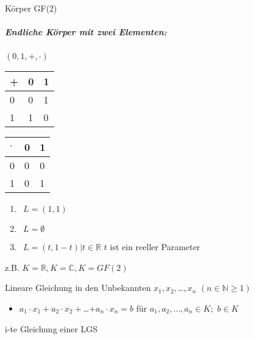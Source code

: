 \documentclass{../tudscript}
\begin{document}
\hypertarget{einfuxfchrung-in-die-mathematik-fuxfcr-informatikerinnen}{%
\label{einfuxfchrung-in-die-mathematik-fuxfcr-informatikerinnen}}

\hypertarget{vl}{%
\label{vl}}

\hypertarget{kuxf6rper-galois-field-gf}{%
\label{kuxf6rper-galois-field-gf}}

Körper GF(2)

\hypertarget{endliche-kuxf6rper-mit-zwei-elementen}{%
\subparagraph{Endliche Körper mit zwei
Elementen:}\label{endliche-kuxf6rper-mit-zwei-elementen}}

\(({0,1},+,\cdot)\)

\begin{longtable}[]{@{}lll@{}}
\toprule
+ & 0 & 1\tabularnewline
\midrule
\endhead
0 & 0 & 1\tabularnewline
1 & 1 & 0\tabularnewline
\bottomrule
\end{longtable}

\begin{longtable}[]{@{}lll@{}}
\toprule
\(\cdot\) & 0 & 1\tabularnewline
\midrule
\endhead
0 & 0 & 0\tabularnewline
1 & 0 & 1\tabularnewline
\bottomrule
\end{longtable}

\begin{enumerate}
\def\labelenumi{\arabic{enumi}.}
\tightlist
\item
  \(\ \ L = {(1,1)}\)
\item
  \(\ \ L = \emptyset\)
\item
  \(\ \ L = {(t,1-t)|t\in\mathbb{R}}\) \(t\) ist ein reeller Parameter
\end{enumerate}

\hypertarget{lgs-und-matritzen-uxfcber-einem-kuxf6rper-k}{%
\label{lgs-und-matritzen-uxfcber-einem-kuxf6rper-k}}

z.B. \(K=\mathbb{R}, K=\mathbb{C},K=GF(2)\)

Lineare Gleichung in den Unbekannten \(x_1,x_2,\)\ldots{}\(,x_n\)
\((n \in \mathbb{N} \geq 1)\)

\begin{itemize}
\tightlist
\item
  \(a_1 \cdot x_1 + a_2 \cdot x_2 +\)\ldots{}\(+a_n \cdot x_n = b\) für
  \(a_1,a_2,...,a_n\in K;\) \(b \in K\)
\end{itemize}

i-te Gleichung einer LGS
\end{document}
